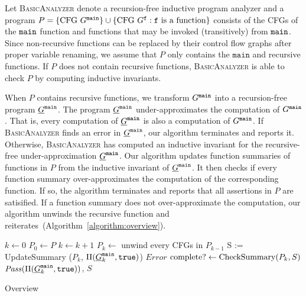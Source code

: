 
Let \textsc{BasicAnalyzer} denote a recursion-free inductive program
analyzer and a program $P=\{\mbox{CFG }G^{\mathtt{{main}}}\}\cup\{\mbox{CFG } G^{\mathtt{{f}}} : \mathtt{{f}}\mbox{ is a function}\}$ consists of the CFGs of the $\mathtt{{main}}$ function and functions that may be invoked (transitively) from $\mathtt{{main}}$.
Since non-recursive functions can be replaced by their control flow graphs
after proper variable renaming, we assume that $P$ only contains the
$\mathtt{main}$ and recursive functions. If $P$ does not contain
recursive functions, \textsc{BasicAnalyzer} is able to check $P$ by
computing inductive invariants.

When $P$ contains recursive functions, we transform $G^{\mathtt{{main}}}$ into a
recursion-free program $\underline{G}^{\mathtt{{main}}}$. The program $\underline{G}^{\mathtt{{main}}}$
under-approximates the computation of $G^{\mathtt{{main}}}$. That is, every computation
of $\underline{G}^{\mathtt{{main}}}$ is also a computation of $G^{\mathtt{{main}}}$. If
\textsc{BasicAnalyzer} finds an error in $\underline{G}^{\mathtt{{main}}}$, our
algorithm terminates and reports it. Otherwise,
\textsc{BasicAnalyzer} has computed an inductive invariant for the
recursive-free under-approximation $\underline{G}^{\mathtt{{main}}}$. Our algorithm
updates function summaries of functions in $P$ from the inductive invariant of
$\underline{G}^{\mathtt{{main}}}$. It then checks if every function summary
over-approximates the computation of the corresponding function. If
so, the algorithm terminates and reports that all assertions in $P$
are satisified. If a function summary does not over-approximate the
computation, our algorithm unwinds the recursive function and
reiterates~(Algorithm~\ref{algorithm:overview}).

\begin{algorithm}

  $k \leftarrow 0$\;
  $P_0 \leftarrow P$\;
  {
    $k \leftarrow k + 1$\;
    $P_{k} \leftarrow $ unwind every CFGs in $P_{k-1}$\;
    {
      {    
        S := UpdateSummary ($P_k$, $\Pi (\underline{G}^{\mathtt{{main}}}_k, \mathtt{true})$)\;
      }
      {
        \Return $\mathit{Error}$\;
      }
    }
    $\textmd{complete?} \leftarrow \textmd{CheckSummary} (P_k, S)$\;
  }
  \Return $\mathit{Pass} (\Pi (\underline{G}^{\mathtt{{main}}}_k, \mathtt{true}))$, $S$\;
  \caption{Overview}
  \label{algorithm:overview}
\end{algorithm}

